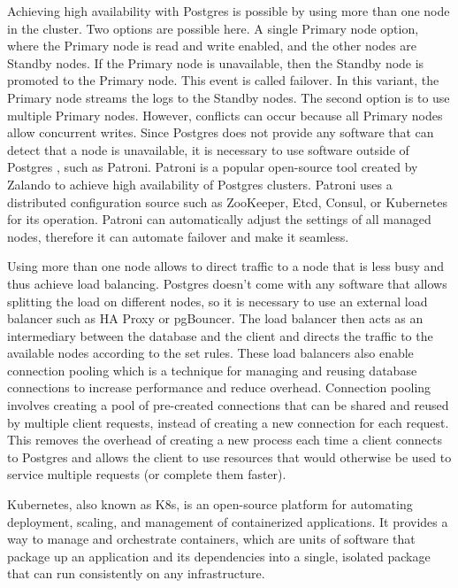 Achieving high availability with Postgres is possible by using more than one node in the cluster. Two options are possible here. A single Primary node option, where the Primary node is read and write enabled, and the other nodes are Standby nodes. If the Primary node is unavailable, then the Standby node is promoted to the Primary node. This event is called failover. In this variant, the Primary node streams the logs to the Standby nodes. The second option is to use multiple Primary nodes. However, conflicts can occur because all Primary nodes allow concurrent writes. \cite{docuPgHA}
Since Postgres does not provide any software that can detect that a node is unavailable, it is necessary to use software outside of Postgres \cite{docuPgFailover}, such as Patroni.
Patroni is a popular open-source tool created by Zalando to achieve high availability of Postgres clusters. Patroni uses a distributed configuration source such as ZooKeeper, Etcd, Consul, or Kubernetes for its operation. Patroni can automatically adjust the settings of all managed nodes, therefore it can automate failover and make it seamless. \cite{PalarkMigratingPg} \cite{PatroniDocu}


Using more than one node allows to direct traffic to a node that is less busy and thus achieve load balancing. Postgres doesn't come with any software that allows splitting the load on different nodes, so it is necessary to use an external load balancer such as HA Proxy or pgBouncer. The load balancer then acts as an intermediary between the database and the client and directs the traffic to the available nodes according to the set rules. These load balancers also enable connection pooling which is a technique for managing and reusing database connections to increase performance and reduce overhead. Connection pooling involves creating a pool of pre-created connections that can be shared and reused by multiple client requests, instead of creating a new connection for each request. This removes the overhead of creating a new process each time a client connects to Postgres and allows the client to use resources that would otherwise be used to service multiple requests (or complete them faster). \cite{PerconaBlogConnectionPooling}

Kubernetes, also known as K8s, is an open-source platform for automating deployment, scaling, and management of containerized applications. It provides a way to manage and orchestrate containers, which are units of software that package up an application and its dependencies into a single, isolated package that can run consistently on any infrastructure. \cite{vayghan2019Kubernetes}


